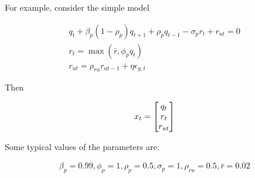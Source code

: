 For example, consider the simple model


\begin{gather*}
q_{t} +\beta_p(1 - \rho_p)q_{t + 1} + \rho_pq_{t - 1} - \sigma_pr_{t} +
     r_{ut}=0\\
 r_{t} = \max (\bar{r}, \phi_pq_{t}) \\
 r_{ut} = \rho_{ru} r_{ut - 1} + \eta \epsilon_{y,t}
\end{gather*}

Then 


\begin{gather*}
  x_t=\begin{bmatrix} q_t\\r_{t}\\r_{ut} \end{bmatrix}
\end{gather*}


Some typical values of the parameters are:

\begin{gather*}
  \beta_p = 0.99, \phi_p = 1, 
\rho_p = 0.5, \sigma_p = 1, \rho_{ru} = 0.5,
  \bar{r} = 0.02 \\
\end{gather*}

%

